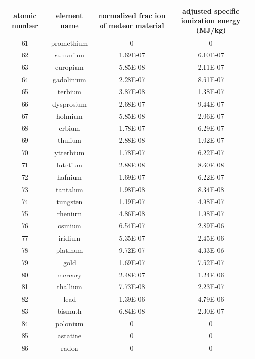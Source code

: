 \documentclass[a4paper]{article}
\begin{document}
	\begin{center}
		\begin{tabular}{|c|c|c|c|}
			\hline
			atomic number & element name & normalized fraction of meteor material & adjusted specific ionization energy (MJ/kg) \\
			\hline
			61 & promethium & 0 & 0 \\
			\hline
			62 & samarium & 1.69E-07 & 6.10E-07 \\
			\hline
			63 & europium & 5.85E-08 & 2.11E-07 \\
			\hline
			64 & gadolinium & 2.28E-07 & 8.61E-07 \\
			\hline
			65 & terbium & 3.87E-08 & 1.38E-07 \\
			\hline
			66 & dysprosium & 2.68E-07 & 9.44E-07 \\
			\hline
			67 & holmium & 5.85E-08 & 2.06E-07 \\
			\hline
			68 & erbium & 1.78E-07 & 6.29E-07 \\
			\hline
			69 & thulium & 2.88E-08 & 1.02E-07 \\
			\hline
			70 & ytterbium & 1.78E-07 & 6.22E-07 \\
			\hline
			71 & lutetium & 2.88E-08 & 8.60E-08 \\
			\hline
			72 & hafnium & 1.69E-07 & 6.22E-07 \\
			\hline
			73 & tantalum & 1.98E-08 & 8.34E-08 \\
			\hline
			74 & tungsten & 1.19E-07 & 4.98E-07 \\
			\hline
			75 & rhenium & 4.86E-08 & 1.98E-07 \\
			\hline
			76 & osmium & 6.54E-07 & 2.89E-06 \\
			\hline
			77 & iridium & 5.35E-07 & 2.45E-06 \\
			\hline
			78 & platinum & 9.72E-07 & 4.33E-06 \\
			\hline
			79 & gold & 1.69E-07 & 7.62E-07 \\
			\hline
			80 & mercury & 2.48E-07 & 1.24E-06 \\
			\hline
			81 & thallium & 7.73E-08 & 2.23E-07 \\
			\hline
			82 & lead & 1.39E-06 & 4.79E-06 \\
			\hline
			83 & bismuth & 6.84E-08 & 2.30E-07 \\
			\hline
			84 & polonium & 0 & 0 \\
			\hline
			85 & astatine & 0 & 0 \\
			\hline
			86 & radon & 0 & 0 \\

\end{tabular}
\end{center}
\end{document}
